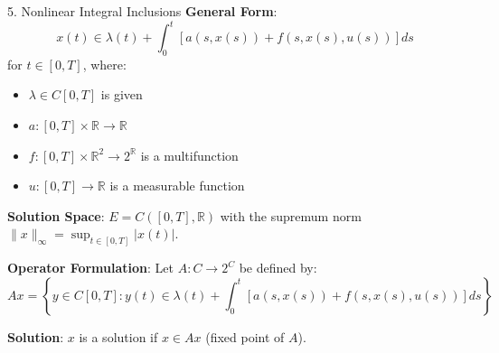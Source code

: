 \documentclass[aspectratio=169,10pt]{beamer}
\begin{document}
\begin{frame}[allowframebreaks]{5. Nonlinear Integral Inclusions}
    \textbf{General Form}:
    $$x(t) \in \lambda(t) + \int_0^t [a(s,x(s)) + f(s, x(s), u(s))] ds$$
    for $t \in [0,T]$, where:
    \begin{itemize}
        \item $\lambda \in C[0,T]$ is given
        \item $a: [0,T] \times \mathbb{R} \to \mathbb{R}$
        \item $f: [0,T] \times \mathbb{R}^2 \to 2^{\mathbb{R}}$ is a multifunction
        \item $u: [0,T] \to \mathbb{R}$ is a measurable function
    \end{itemize}

    \vspace{0.4cm}
    \textbf{Solution Space}:
    $E = C([0,T], \mathbb{R})$ with the supremum norm $\|x\|_\infty = \sup_{t \in [0,T]} |x(t)|$.

    \vspace{0.4cm}
    \textbf{Operator Formulation}:
    Let $A: C \to 2^C$ be defined by:
    $$Ax = \left\{ y \in C[0,T] : y(t) \in \lambda(t) + \int_0^t [a(s,x(s)) + f(s,x(s),u(s))] ds \right\}$$

    \vspace{0.4cm}
    \textbf{Solution}: $x$ is a solution if $x \in Ax$ (fixed point of $A$).
\end{frame}
\end{document}
